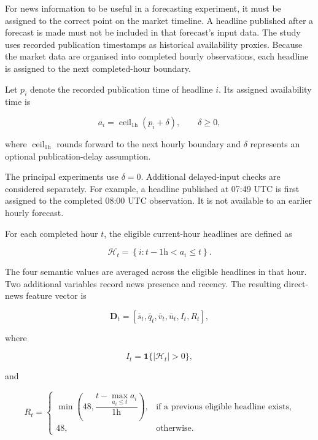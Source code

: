 For news information to be useful in a forecasting experiment, it must be assigned to the correct point on the market timeline. A headline published after a forecast is made must not be included in that forecast's input data. The study uses recorded publication timestamps as historical availability proxies. Because the market data are organised into completed hourly observations, each headline is assigned to the next completed-hour boundary.

Let $p_i$ denote the recorded publication time of headline $i$. Its assigned availability time is

\begin{equation}
a_i
=
\operatorname{ceil}_{1\mathrm{h}}(p_i+\delta),
\qquad \delta\geq 0,
\label{eq:availability}
\end{equation}

where $\operatorname{ceil}_{1\mathrm{h}}$ rounds forward to the next hourly boundary and $\delta$ represents an optional publication-delay assumption.

The principal experiments use $\delta=0$. Additional delayed-input checks are considered separately. For example, a headline published at 07:49 UTC is first assigned to the completed 08:00 UTC observation. It is not available to an earlier hourly forecast.

For each completed hour $t$, the eligible current-hour headlines are defined as

\begin{equation}
\mathcal{H}_t
=
\left\{
i:
t-1\mathrm{h}<a_i\leq t
\right\}.
\label{eq:hourly_news_set}
\end{equation}

The four semantic values are averaged across the eligible headlines in that hour. Two additional variables record news presence and recency. The resulting direct-news feature vector is

\begin{equation}
\mathbf{D}_t
=
\left[
\bar{s}_t,
\bar{q}_t,
\bar{v}_t,
\bar{u}_t,
I_t,
R_t
\right],
\label{eq:direct}
\end{equation}

where

\begin{equation}
I_t
=
\mathbf{1}\{|\mathcal{H}_t|>0\},
\label{eq:news_presence}
\end{equation}

and

\begin{equation}
R_t
=
\begin{cases}
\min\left(48,\dfrac{t-\max_{a_i\leq t}a_i}{1\mathrm{h}}\right),
& \text{if a previous eligible headline exists},\\
48,
& \text{otherwise}.
\end{cases}
\label{eq:news_recency}
\end{equation}

